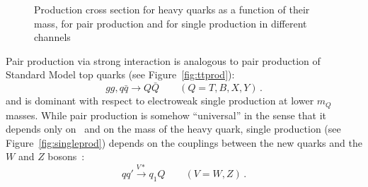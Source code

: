 \begin{figure}[hbt]\begin{center}
\myskip
	\caption{Production cross section for heavy quarks as 
          a function of their mass, for pair production and
          for single production in different 
          channels~\cite{Aguilar-Saavedra:2013qpa}\label{fig:vlqxsec}}
\end{center}\end{figure}

Pair production via strong interaction is analogous to
pair production of Standard Model top quarks 
(see Figure~\ref{fig:ttprod}):
\begin{equation}
gg,q \bar q \to Q \bar Q \quad\quad (Q=T,B,X,Y) \,.
\end{equation}
and is dominant with respect to electroweak single
production at lower $m_Q$ masses. While pair production
is somehow ``universal'' in the sense that it depends only
on \alphas\ and on the mass of the heavy quark,
single production (see Figure~\ref{fig:singleprod}) depends on the couplings between
the new quarks and the $W$ and $Z$ bosons~\cite{Aguilar-Saavedra:2013qpa,Atre:2011ae}:
\begin{equation}
q q' \xrightarrow{V*} q_1Q \quad\quad (V=W,Z) \,.
\end{equation}

